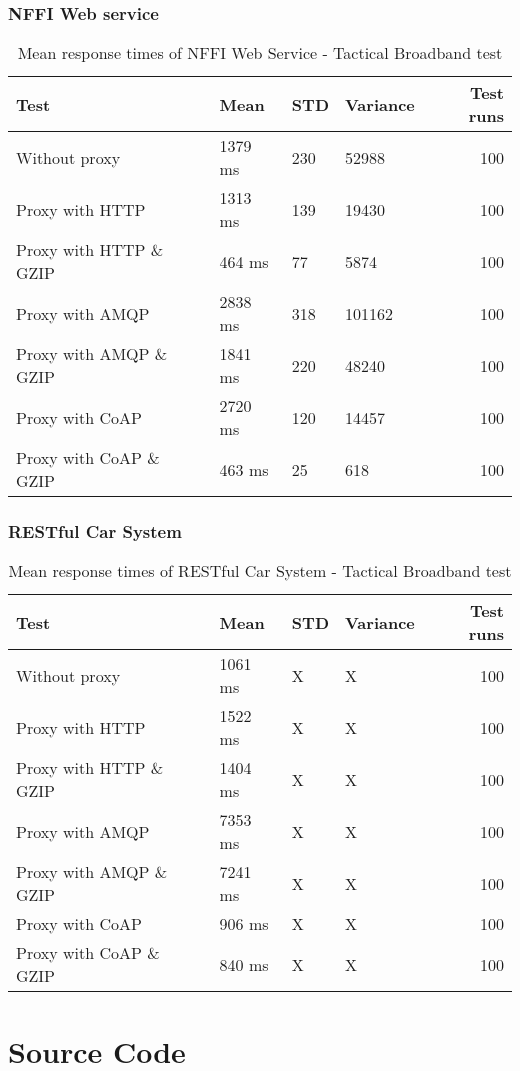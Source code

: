 \begin{appendices}
\subsection{NFFI Web service}

\begin{table}[H]
\begin{tabular}{llllr}
\hline
 Test                   &   Mean &   STD &   Variance &   Test runs \\
\hline
  Without proxy & 1379 ms & 230 & 52988 & 100 \\
  Proxy with HTTP & 1313 ms & 139 & 19430 & 100 \\
  Proxy with HTTP \& GZIP & 464 ms & 77 & 5874 & 100 \\
  Proxy with AMQP & 2838 ms & 318 & 101162 & 100 \\
  Proxy with AMQP \& GZIP & 1841 ms & 220 & 48240 & 100\\
  Proxy with CoAP & 2720 ms & 120 & 14457 & 100 \\
  Proxy with CoAP \& GZIP & 463 ms & 25 & 618 & 100 \\
\end{tabular}
\caption{Mean response times of NFFI Web Service - Tactical Broadband test}
\end{table}

\subsection{RESTful Car System}

\begin{table}[H]
\begin{tabular}{llllr}
\hline
 Test                   &   Mean &   STD  &   Variance &   Test runs \\
\hline
  Without proxy & 1061 ms & X & X & 100 \\
  Proxy with HTTP & 1522 ms & X & X & 100 \\
  Proxy with HTTP \& GZIP & 1404 ms & X & X & 100 \\
  Proxy with AMQP & 7353 ms & X & X & 100 \\
  Proxy with AMQP \& GZIP & 7241 ms & X & X & 100\\
  Proxy with CoAP & 906 ms & X & X & 100 \\
  Proxy with CoAP \& GZIP & 840 ms & X & X & 100 \\
\end{tabular}
\caption{Mean response times of RESTful Car System - Tactical Broadband test}
\end{table}

\chapter{Source Code}
\label{appendix-source-code}

\end{appendices}

